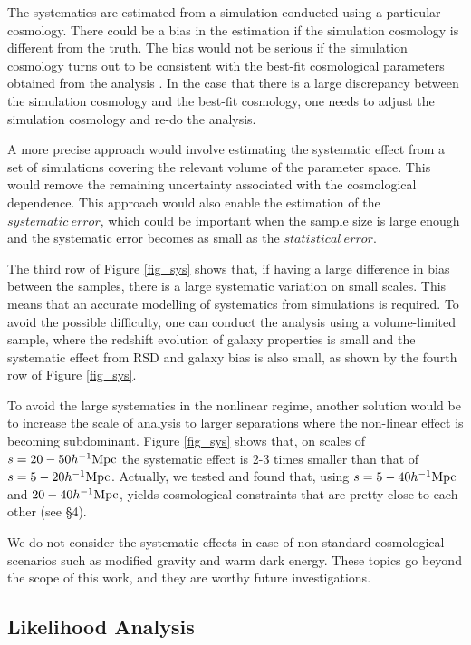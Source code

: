 \documentclass[iop]{emulateapj}
\begin{document}
The systematics are estimated from a simulation conducted using a particular cosmology. 
There could be a bias in the estimation if the simulation cosmology is different from the truth. 
The bias would not be serious if the simulation cosmology turns out to be consistent with the best-fit cosmological parameters obtained from the analysis \cite{Li2016}. 
In the case that there is a large discrepancy between the simulation cosmology and the best-fit cosmology, one needs to adjust the simulation cosmology and re-do the analysis.

A more precise approach would involve estimating the systematic effect from a set of simulations covering the relevant volume of the parameter space. 
This would remove the remaining uncertainty associated with the cosmological dependence. 
This approach would also enable the estimation of the $systematic\ error$, 
which could be important when the sample size is large enough and the systematic error becomes as small as the $statistical\ error$.

The third row of Figure \ref{fig_sys} shows that, 
if having a large difference in bias between the samples,
there is a large systematic variation on small scales. 
This means that an accurate modelling of systematics from simulations is required. 
To avoid the possible difficulty, one can conduct the analysis using a volume-limited sample, 
where the redshift evolution of galaxy properties is small and the systematic effect from RSD and galaxy bias is also small,
as shown by the fourth row of Figure \ref{fig_sys}.

To avoid the large systematics in the nonlinear regime, 
another solution would be to increase the scale of analysis to larger separations where the non-linear effect is becoming subdominant. 
Figure \ref{fig_sys} shows that, 
on scales of $s=20-50 h^{-1} {\rm Mpc}$ the systematic effect is 2-3 times smaller than that of $s=5-20 h^{-1} {\rm Mpc}$. 
Actually, we tested and found that, using $s = 5-40 h^{-1} {\rm Mpc}$ and $20-40 h^{-1} {\rm Mpc}$, 
yields cosmological constraints that are pretty close to each other (see \S 4). 

We do not consider the systematic effects in case of non-standard cosmological scenarios such as modified gravity and warm dark energy. 
These topics go beyond the scope of this work, and they are worthy future investigations.


\subsection{Likelihood Analysis}
\end{document}
